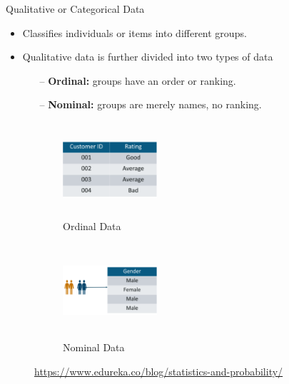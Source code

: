 \documentclass[10pt,dvipsnames, aspectratio=169]{beamer}
\begin{document}
	\begin{frame}[t]{Qualitative  or Categorical Data}
		\begin{itemize}
			\item Classifies individuals or items into different groups.
			\item Qualitative data is further divided into two types of data
			\begin{itemize}
				\item[--] \textbf{Ordinal:} groups have an order or ranking.
				\item [--]\textbf{Nominal:} groups are merely names, no ranking.
			\end{itemize}
		\end{itemize}
		
		\begin{figure}[h]
			\centering
			\begin{subfigure}{0.45\textwidth}
				\centering
				\includegraphics[width=3.5cm, 
				height=3.5cm]{stats_img/ordinal.png}
				\caption{Ordinal Data}
			\end{subfigure}
			\hfil
			\begin{subfigure}{0.45\textwidth}
				\centering
				\includegraphics[width=3.5cm, 
				height=3.5cm]{stats_img/nominal.png}
				\caption{Nominal Data}
			\end{subfigure}
			\caption{\url{https://www.edureka.co/blog/statistics-and-probability/}}
		\end{figure}
	\end{frame}
\end{document}
